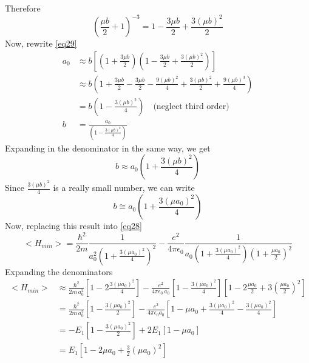 \documentclass[12 pt]{article}
\numberwithin{equation}{section}
\begin{document}
Therefore
\begin{equation}\label{eq211}
  \left(\frac{\mu b}{2} + 1\right)^{-3} =  1 - \frac{3\mu b}{2} + \frac{3(\mu b)^2}{2}
\end{equation}
Now, rewrite \autoref{eq29}
\begin{equation}\label{eq212}
  \begin{aligned}
    a_0 &\approx b\left[\left(1+\frac{3\mu b}{2}\right)\left( 1 - \frac{3\mu b}{2}
    + \frac{3(\mu b)^2}{2} \right)\right]\\
        &\approx b\left(1 + \frac{3\mu b}{2} - \frac{3\mu b}{2} - \frac{9(\mu b)^2}{4}
        + \frac{3(\mu b)^2}{2}+\frac{9(\mu b)^3}{4}\right)\\
        &= b\left(1 - \frac{3(\mu b)^2}{4}\right) \quad \text{(neglect third order)}\\
      b &= \frac{a_0}{\left(1 - \frac{3(\mu b)^2}{4}\right)  }
\end{aligned}
\end{equation}
Expanding in the denominator in the same way, we get 
\begin{equation}\label{eq213}
b \approx a_0 \left(1 + \frac{3(\mu b)^2}{4}\right)
\end{equation}
Since $\frac{3(\mu b)^2}{4}$ is a really small number, we can write 
\begin{equation}\label{eq214}
b \cong a_0 \left(1 + \frac{3(\mu a_0)^2}{4}\right)
\end{equation}
Now, replacing this result into \autoref{eq28}
\begin{equation}\label{eq215}
  \big<H_{min}\big> = \frac{\hbar^2}{2m}\frac{1}{a_0^2 \left(1 + \frac{3(\mu a_0)^2}{4}\right)^2}
  -\frac{e^2}{4\pi\epsilon_0}\frac{1}
  {a_0 \left(1 + \frac{3(\mu a_0)^2}{4}\right)\left(1+\frac{\mu a_0}{2}\right)^2} 
\end{equation}
Expanding the denominators
\begin{equation}\label{eq216}
\begin{aligned}
  \big<H_{min}\big> &\approx \frac{\hbar^2}{2m\,a_0^2}\left[1-2\frac{3{(\mu a_0)^2}}{4}\right]
  -\frac{e^2}{4\pi\epsilon_0\,a_0}\left[1-\frac{3(\mu a_0)^2}{4}\right]
  \left[1 -2 \frac{\mu a_0}{2} + 3\left(\frac{\mu a_0}{2}\right)^2 \right]\\
  &=\frac{\hbar^2}{2m\,a_0^2}\left[1-\frac{3{(\mu a_0)^2}}{2}\right] -\frac{e^2}{4\pi\epsilon_0 a_0}
  \left[1-\mu a_0 + \frac{3(\mu a_0)^2}{4} - \frac{3(\mu a_0)^2}{4}\right]\\
  &= -E_1\left[1-\frac{3{(\mu a_0)^2}}{2}\right]+2E_1[1-\mu a_0]\\
  &= \boxed{E_1\left[1-2\mu a_0 + \frac{3}{2}(\mu a_0)^2\right]}
\end{aligned}
\end{equation}
\end{document}
